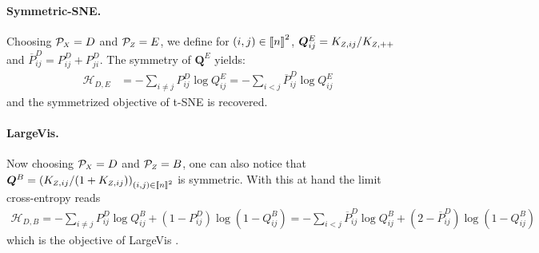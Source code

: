 \paragraph{Symmetric-SNE.}
Choosing $\mathcal{P}_{\scaleto{X}{4pt}} = D$ and $\mathcal{P}_{\scaleto{Z}{4pt}} = E$, we define for $(i,j) \in {[\![n]\!]}^2$, $\bm{Q}^{E}_{ij} = K_{\scaleto{Z}{4pt},ij} / K_{\scaleto{Z}{4pt},++}$ and $\overline{P}^{D}_{ij} = P^{D}_{ij} + P^{D}_{ji}$. The symmetry of $\bm{Q}^{E}$ yields:
\begin{align*}
    \mathcal{H}_{D,E} &= - \sum_{i \neq j} P^{D}_{ij} \log Q^{E}_{ij} = - \sum_{i < j} \overline{P}^{D}_{ij} \log Q^{E}_{ij}
\end{align*}
and the symmetrized objective of t-SNE \cite{maaten2008tSNE} is recovered. 

\paragraph{LargeVis.}
Now choosing $\mathcal{P}_{\scaleto{X}{4pt}} = D$ and $\mathcal{P}_{\scaleto{Z}{4pt}} = B$, one can also notice that $\bm{Q}^{B} = \left( K_{\scaleto{Z}{4pt},ij} / (1+K_{\scaleto{Z}{4pt},ij}) \right)_{(i,j) \in \integ{n}^2}$ is symmetric. With this at hand the limit cross-entropy reads
\begin{align*}
    \mathcal{H}_{D,B} = - \sum_{i \neq j} P^{D}_{ij} \log Q^{B}_{ij} + \left(1 - P^{D}_{ij} \right) \log\left(1-Q^{B}_{ij} \right)
    = - \sum_{i < j} \overline{P}^{D}_{ij} \log Q^{B}_{ij} + \left(2-\overline{P}^{D}_{ij}\right) \log (1- Q^{B}_{ij})
\end{align*}
which is the objective of LargeVis \cite{tang2016visualizing}.

